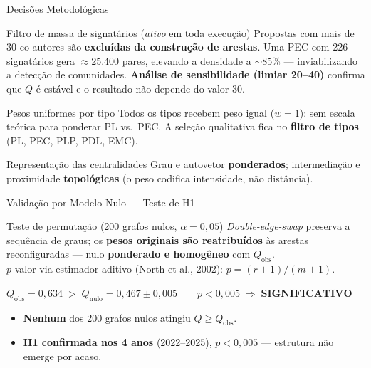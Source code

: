 \documentclass{beamer}
\begin{document}
\begin{frame}{Decisões Metodológicas}
\begin{block}{Filtro de massa de signatários (\textit{ativo} em toda execução)}
Propostas com mais de 30 co-autores são \textbf{excluídas da construção de arestas}. Uma PEC com 226 signatários gera $\approx 25.400$ pares, elevando a densidade a $\sim$85\% — inviabilizando a detecção de comunidades. \textbf{Análise de sensibilidade (limiar 20--40)} confirma que $Q$ é estável e o resultado não depende do valor 30.
\end{block}

\begin{block}{Pesos uniformes por tipo}
Todos os tipos recebem peso igual ($w=1$): sem escala teórica para ponderar PL vs.\ PEC. A seleção qualitativa fica no \textbf{filtro de tipos} (PL, PEC, PLP, PDL, EMC).
\end{block}

\begin{block}{Representação das centralidades}
Grau e autovetor \textbf{ponderados}; intermediação e proximidade \textbf{topológicas} (o peso codifica intensidade, não distância).
\end{block}
\end{frame}

\begin{frame}{Validação por Modelo Nulo — Teste de H1}
\begin{block}{Teste de permutação (200 grafos nulos, $\alpha = 0{,}05$)}
\textit{Double-edge-swap} preserva a sequência de graus; os \textbf{pesos originais são reatribuídos} às arestas reconfiguradas — nulo \textbf{ponderado e homogêneo} com $Q_{\text{obs}}$. \\
$p$-valor via estimador aditivo (North et al., 2002): $p = (r+1)/(m+1)$.
\end{block}

\vspace{0.2cm}
\begin{center}
$Q_{\text{obs}} = 0{,}634 \;>\; Q_{\text{nulo}} = 0{,}467 \pm 0{,}005 \qquad p < 0{,}005 \;\Rightarrow\; \textbf{SIGNIFICATIVO}$
\end{center}
\vspace{0.2cm}

\begin{itemize}\footnotesize
  \item \textbf{Nenhum} dos 200 grafos nulos atingiu $Q \geq Q_{\text{obs}}$.
  \item \textbf{H1 confirmada nos 4 anos} (2022--2025), $p < 0{,}005$ — estrutura não emerge por acaso.
\end{itemize}
\end{frame}
\end{document}
